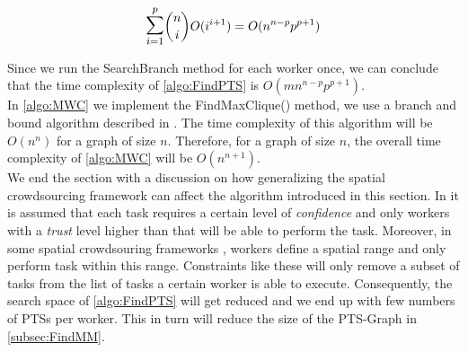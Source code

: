 \begin{equation*}
\mathlarger{\mathlarger{\sum}}_{i = 1}^{p} \dbinom{n}{i} O(i^{i+1}) = O(n^{n-p}p^{p+1})
\end{equation*}

Since we run the SearchBranch method for each worker once, we can conclude that the time complexity of \cref{algo:FindPTS} is $O(mn^{n-p}p^{p+1})$.\\

In \cref{algo:MWC} we implement the FindMaxClique() method, we use a branch and bound algorithm described in \cite{Ostergard01}. The time complexity of this algorithm will be $O(n^n)$ for a graph of size $n$. Therefore, for a graph of size $n$, the overall time complexity of \cref{algo:MWC} will be $O(n^{n+1})$.\\

We end the section with a discussion on how generalizing the spatial crowdsourcing framework can affect the algorithm introduced in this section. In \cite{Kazemi13} it is assumed that each task requires a certain level of \emph{confidence} and only workers with a \emph{trust} level higher than that will be able to perform the task. Moreover, in some spatial crowdsouring frameworks \cite{Kazemi12,Kazemi13,Deng13}, workers define a spatial range and only perform task within this range. Constraints like these will only remove a subset of tasks from the list of tasks a certain worker is able to execute. Consequently, the search space of \cref{algo:FindPTS} will get reduced and we end up with few numbers of PTSs per worker. This in turn will reduce the size of the PTS-Graph in \cref{subsec:FindMM}.